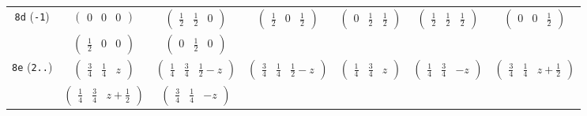 \documentclass[fleqn,9pt,landscape]{jsarticle}
\begin{document}
\begin{center}
\begin{longtable}{ccccccc}
{\tt 8d} ({\tt -1}) & $ \begin{pmatrix} 0 & 0 & 0 \end{pmatrix} $ & $ \begin{pmatrix} \frac{1}{2} & \frac{1}{2} & 0 \end{pmatrix} $ & $ \begin{pmatrix} \frac{1}{2} & 0 & \frac{1}{2} \end{pmatrix} $ & $ \begin{pmatrix} 0 & \frac{1}{2} & \frac{1}{2} \end{pmatrix} $ & $ \begin{pmatrix} \frac{1}{2} & \frac{1}{2} & \frac{1}{2} \end{pmatrix} $ & $ \begin{pmatrix} 0 & 0 & \frac{1}{2} \end{pmatrix} $ \\
& $ \begin{pmatrix} \frac{1}{2} & 0 & 0 \end{pmatrix} $ & $ \begin{pmatrix} 0 & \frac{1}{2} & 0 \end{pmatrix} $ & $  $ & $  $ & $  $ & $  $ \\ \hline
{\tt 8e} ({\tt 2..}) & $ \begin{pmatrix} \frac{3}{4} & \frac{1}{4} & z \end{pmatrix} $ & $ \begin{pmatrix} \frac{1}{4} & \frac{3}{4} & \frac{1}{2} - z \end{pmatrix} $ & $ \begin{pmatrix} \frac{3}{4} & \frac{1}{4} & \frac{1}{2} - z \end{pmatrix} $ & $ \begin{pmatrix} \frac{1}{4} & \frac{3}{4} & z \end{pmatrix} $ & $ \begin{pmatrix} \frac{1}{4} & \frac{3}{4} & - z \end{pmatrix} $ & $ \begin{pmatrix} \frac{3}{4} & \frac{1}{4} & z + \frac{1}{2} \end{pmatrix} $ \\
& $ \begin{pmatrix} \frac{1}{4} & \frac{3}{4} & z + \frac{1}{2} \end{pmatrix} $ & $ \begin{pmatrix} \frac{3}{4} & \frac{1}{4} & - z \end{pmatrix} $ & $  $ & $  $ & $  $ & $  $ \\ \hline

\end{longtable}
\end{center}
\end{document}
